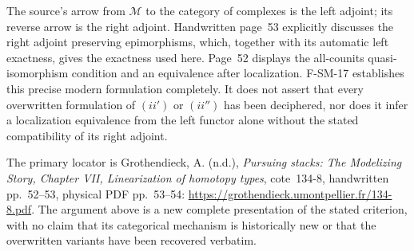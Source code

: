 The source's arrow from $\mathcal M$ to the category of complexes is
the left adjoint; its reverse arrow is the right adjoint.
Handwritten page~53 explicitly discusses the right adjoint preserving
epimorphisms, which, together with its automatic left exactness,
gives the exactness used here.  Page~52 displays the all-counits
quasi-isomorphism condition and an equivalence after localization.
F-SM-17 establishes this precise modern formulation completely.
It does not assert that every overwritten formulation of
$(ii')$ or $(ii'')$ has been deciphered, nor does it infer a localization
equivalence from the left functor alone without the stated compatibility
of its right adjoint.

The primary locator is Grothendieck, A. (n.d.),
\emph{Pursuing stacks: The Modelizing Story, Chapter VII,
Linearization of homotopy types}, cote~134-8, handwritten
pp.~52--53, physical PDF pp.~53--54:
\url{https://grothendieck.umontpellier.fr/134-8.pdf}.
The argument above is a new complete presentation of the stated
criterion, with no claim that its categorical mechanism is historically
new or that the overwritten variants have been recovered verbatim.
